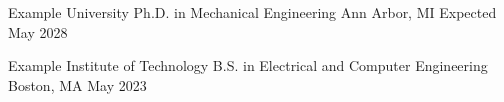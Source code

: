 
\VectraEducationEntry
    {Example University}
    {Ph.D. in Mechanical Engineering}
    {Ann Arbor, MI}
    {Expected May 2028}

\VectraEducationEntry
    {Example Institute of Technology}
    {B.S. in Electrical and Computer Engineering}
    {Boston, MA}
    {May 2023}